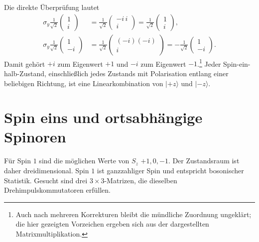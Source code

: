 \begin{classroomqa}
\end{classroomqa}

Die direkte Überprüfung lautet
\begin{align}
\sigma_y\frac{1}{\sqrt2}
\begin{pmatrix}
1\\
i
\end{pmatrix}
&=
\frac{1}{\sqrt2}
\begin{pmatrix}
-i\,i\\
i
\end{pmatrix}
=
\frac{1}{\sqrt2}
\begin{pmatrix}
1\\
i
\end{pmatrix},\\
\sigma_y\frac{1}{\sqrt2}
\begin{pmatrix}
1\\
-i
\end{pmatrix}
&=
\frac{1}{\sqrt2}
\begin{pmatrix}
(-i)(-i)\\
i
\end{pmatrix}
=
-\frac{1}{\sqrt2}
\begin{pmatrix}
1\\
-i
\end{pmatrix}.
\end{align}
Damit gehört \(+i\) zum Eigenwert \(+1\) und \(-i\) zum Eigenwert \(-1\).\footnote{Auch nach mehreren Korrekturen bleibt die mündliche Zuordnung ungeklärt; die hier gezeigten Vorzeichen ergeben sich aus der dargestellten Matrixmultiplikation.} Jeder Spin-ein-halb-Zustand, einschließlich jedes Zustands mit Polarisation entlang einer beliebigen Richtung, ist eine Linearkombination von \(|+z\rangle\) und \(|-z\rangle\).

\section{Spin eins und ortsabhängige Spinoren}

Für Spin \(1\) sind die möglichen Werte von \(S_z\) \(+1,0,-1\). Der Zustandsraum ist daher dreidimensional. Spin \(1\) ist ganzzahliger Spin und entspricht bosonischer Statistik. Gesucht sind drei \(3\times3\)-Matrizen, die dieselben Drehimpulskommutatoren erfüllen.

